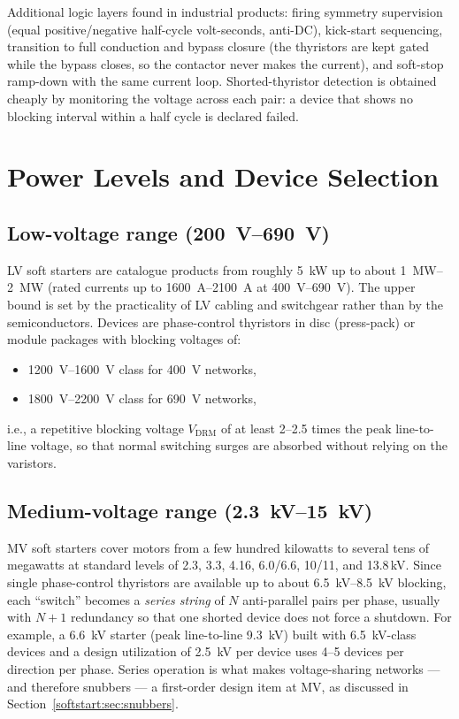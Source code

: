 Additional logic layers found in industrial products: firing symmetry
supervision (equal positive/negative half-cycle volt-seconds, anti-DC),
kick-start sequencing, transition to full conduction and bypass closure
(the thyristors are kept gated while the bypass closes, so the contactor
never makes the current), and soft-stop ramp-down with the same current
loop. Shorted-thyristor detection is obtained cheaply by monitoring the
voltage across each pair: a device that shows no blocking interval within a
half cycle is declared failed.

\section{Power Levels and Device Selection}

\subsection{Low-voltage range (\SIrange{200}{690}{\volt})}

LV soft starters are catalogue products from roughly \SI{5}{\kilo\watt} up to
about \SIrange{1}{2}{\mega\watt} (rated currents up to
\SIrange{1600}{2100}{\ampere} at \SI{400}{\volt}--\SI{690}{\volt}). The upper
bound is set by the practicality of LV cabling and switchgear rather than by
the semiconductors. Devices are phase-control thyristors in disc (press-pack)
or module packages with blocking voltages of:
\begin{itemize}
  \item \SIrange{1200}{1600}{\volt} class for \SI{400}{\volt} networks,
  \item \SIrange{1800}{2200}{\volt} class for \SI{690}{\volt} networks,
\end{itemize}
i.e., a repetitive blocking voltage $V_\mathrm{DRM}$ of at least 2--2.5 times
the peak line-to-line voltage, so that normal switching surges are absorbed
without relying on the varistors.

\subsection{Medium-voltage range (\SIrange{2.3}{15}{\kilo\volt})}

MV soft starters cover motors from a few hundred kilowatts to several tens of
megawatts at standard levels of 2.3, 3.3, 4.16, 6.0/6.6, 10/11, and
13.8\,\si{\kilo\volt}. Since single phase-control thyristors are available up
to about \SIrange{6.5}{8.5}{\kilo\volt} blocking, each ``switch'' becomes a
\emph{series string} of $N$ anti-parallel pairs per phase, usually with $N+1$
redundancy so that one shorted device does not force a shutdown. For example,
a \SI{6.6}{\kilo\volt} starter (peak line-to-line \SI{9.3}{\kilo\volt}) built
with \SI{6.5}{\kilo\volt}-class devices and a design utilization of
\SI{2.5}{\kilo\volt} per device uses 4--5 devices per direction per phase.
Series operation is what makes voltage-sharing networks --- and therefore
snubbers --- a first-order design item at MV, as discussed in
Section~\ref{softstart:sec:snubbers}.

